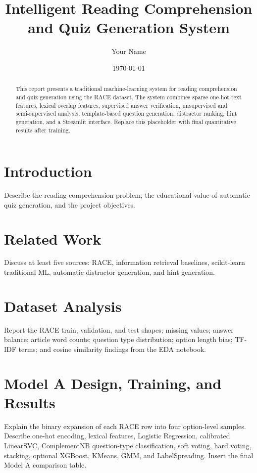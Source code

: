 \documentclass[11pt]{article}
\title{Intelligent Reading Comprehension and Quiz Generation System}
\author{Your Name}
\date{\today}
\begin{document}
\maketitle

\begin{abstract}
This report presents a traditional machine-learning system for reading comprehension and quiz generation using the RACE dataset. The system combines sparse one-hot text features, lexical overlap features, supervised answer verification, unsupervised and semi-supervised analysis, template-based question generation, distractor ranking, hint generation, and a Streamlit interface. Replace this placeholder with final quantitative results after training.
\end{abstract}

\section{Introduction}
Describe the reading comprehension problem, the educational value of automatic quiz generation, and the project objectives.

\section{Related Work}
Discuss at least five sources: RACE, information retrieval baselines, scikit-learn traditional ML, automatic distractor generation, and hint generation.

\section{Dataset Analysis}
Report the RACE train, validation, and test shapes; missing values; answer balance; article word counts; question type distribution; option length bias; TF-IDF terms; and cosine similarity findings from the EDA notebook.

\section{Model A Design, Training, and Results}
Explain the binary expansion of each RACE row into four option-level samples. Describe one-hot encoding, lexical features, Logistic Regression, calibrated LinearSVC, ComplementNB question-type classification, soft voting, hard voting, stacking, optional XGBoost, KMeans, GMM, and LabelSpreading. Insert the final Model A comparison table.
\end{document}
